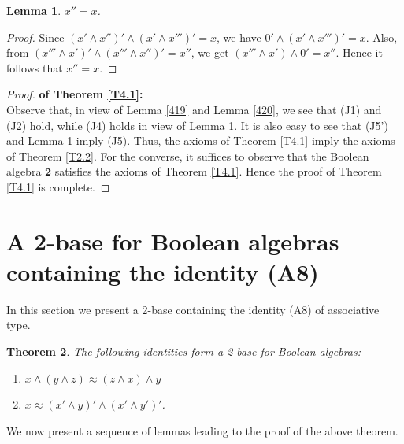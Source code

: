\documentclass{amsart}
\theoremstyle{plain}
\newtheorem{theorem}{Theorem}[section]
\newtheorem{lemma}[theorem]{Lemma}
\theoremstyle{problem}
\theoremstyle{definition}
\theoremstyle{remark}
\numberwithin{equation}{section}
\begin{document}
\begin{lemma} \label{424}
    $x''=x$.
\end{lemma}
\begin{proof}
    Since $(x' \land x'')' \land (x' \land x''')' = x$, we have $0' \land (x' \land x''')' = x$.  Also,
    from $(x''' \land x')' \land (x''' \land x'')' = x''$, we get $(x''' \land x') \land 0' = x''$.  Hence it follows that $x''=x$.
\end{proof}

\begin{proof} {\bf of Theorem \ref{T4.1}:} \\
Observe that, in view of Lemma \ref{419} and Lemma \ref{420}, we see that (J1) and (J2) hold, while (J4) holds in view of Lemma \ref{424}.  It is also easy to see that (J5') and Lemma \ref{424} imply (J5).  %
Thus, the axioms of Theorem \ref{T4.1} imply the axioms of Theorem \ref{T2.2}.  For the converse, it suffices to observe that the Boolean algebra $\mathbf{2}$ satisfies the axioms of Theorem \ref{T4.1}.
Hence the proof of Theorem \ref{T4.1} is complete. 
\end{proof}



\medskip

\section{A 2-base for Boolean algebras containing the identity (A8)}

     
      In this section we present a 2-base containing the identity (A8) of associative type.
    
\begin{theorem} \label{T5.1}
    The following identities form a 2-base for Boolean algebras:
\begin{enumerate}
   \item[{\rm(A8)}] ${x \land ( y \land z )\approx (z \land x) \land y}$  %
   \item[{\rm(J5')}] ${x \approx (x' \land y)' \land (x' \land y')'}$.  
\end{enumerate}
\end{theorem}
      We now present a sequence of lemmas leading to the proof of the above theorem.
\end{document}
